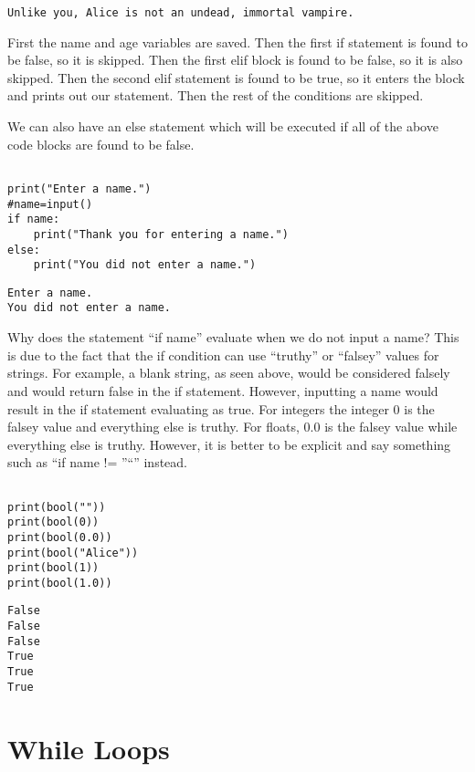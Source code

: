 \documentclass[11pt]{article}
\begin{document}
\begin{verbatim}
Unlike you, Alice is not an undead, immortal vampire.
\end{verbatim}


First the name and age variables are saved. Then the first if statement is found to be false, so it is skipped. Then the first elif block is found to be false, so it is also skipped. Then the second elif statement is found to be true, so it enters the block and prints out our statement. Then the rest of the conditions are skipped.

We can also have an else statement which will be executed if all of the above code blocks are found to be false.


\begin{verbatim}

print("Enter a name.")
#name=input()
if name:
    print("Thank you for entering a name.")
else:
    print("You did not enter a name.")
\end{verbatim}

\begin{verbatim}
Enter a name.
You did not enter a name.
\end{verbatim}


Why does the statement ``if name'' evaluate when we do not input a name? This is due to the fact that the if condition can use ``truthy'' or ``falsey'' values for strings. For example, a blank string, as seen above, would be considered falsely and would return false in the if statement. However, inputting a name would result in the if statement evaluating as true. For integers the integer 0 is the falsey value and everything else is truthy. For floats, 0.0 is the falsey value while everything else is truthy. However, it is better to be explicit and say something such as ``if name != ''``'' instead.


\begin{verbatim}

print(bool(""))
print(bool(0))
print(bool(0.0))
print(bool("Alice"))
print(bool(1))
print(bool(1.0))

\end{verbatim}

\begin{verbatim}
False
False
False
True
True
True
\end{verbatim}

\section{While Loops}
\label{sec:org36d7140}
\end{document}
